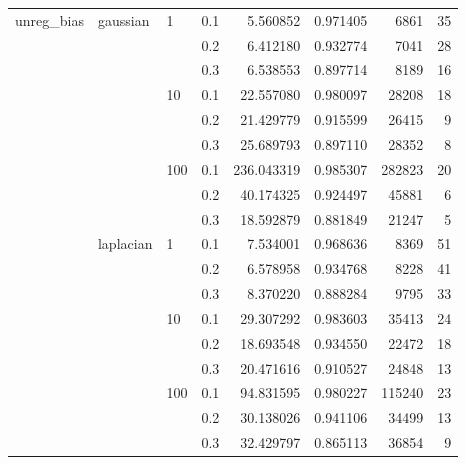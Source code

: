 \begin{table}[H]
\begin{tabular}{llllrrrr}
unreg\_bias & gaussian & 1   & 0.1 &    5.560852 &  0.971405 &    6861 &    35 \\
           &           &     & 0.2 &    6.412180 &  0.932774 &    7041 &    28 \\
           &           &     & 0.3 &    6.538553 &  0.897714 &    8189 &    16 \\
           &           & 10  & 0.1 &   22.557080 &  0.980097 &   28208 &    18 \\
           &           &     & 0.2 &   21.429779 &  0.915599 &   26415 &     9 \\
           &           &     & 0.3 &   25.689793 &  0.897110 &   28352 &     8 \\
           &           & 100 & 0.1 &  236.043319 &  0.985307 &  282823 &    20 \\
           &           &     & 0.2 &   40.174325 &  0.924497 &   45881 &     6 \\
           &           &     & 0.3 &   18.592879 &  0.881849 &   21247 &     5 \\
           & laplacian & 1   & 0.1 &    7.534001 &  0.968636 &    8369 &    51 \\
           &           &     & 0.2 &    6.578958 &  0.934768 &    8228 &    41 \\
           &           &     & 0.3 &    8.370220 &  0.888284 &    9795 &    33 \\
           &           & 10  & 0.1 &   29.307292 &  0.983603 &   35413 &    24 \\
           &           &     & 0.2 &   18.693548 &  0.934550 &   22472 &    18 \\
           &           &     & 0.3 &   20.471616 &  0.910527 &   24848 &    13 \\
           &           & 100 & 0.1 &   94.831595 &  0.980227 &  115240 &    23 \\
           &           &     & 0.2 &   30.138026 &  0.941106 &   34499 &    13 \\
           &           &     & 0.3 &   32.429797 &  0.865113 &   36854 &     9 \\
\bottomrule
\end{tabular}
\end{table}
